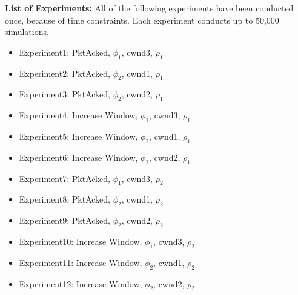 \textbf{List of Experiments:}
All of the following experiments have been conducted once, because of time constraints. Each experiment conducts up to 50,000 simulations.
\begin{itemize}
	\item{Experiment1: PktAcked, $\phi_1$, cwnd3, $\rho_1$}
	\item{Experiment2: PktAcked, $\phi_2$, cwnd1, $\rho_1$}
	\item{Experiment3: PktAcked, $\phi_2$, cwnd2, $\rho_1$}
	\item{Experiment4: Increase Window, $\phi_1$, cwnd3, $\rho_1$}
	\item{Experiment5: Increase Window, $\phi_2$, cwnd1, $\rho_1$}
	\item{Experiment6: Increase Window, $\phi_2$, cwnd2, $\rho_1$}
	\item{Experiment7: PktAcked, $\phi_1$, cwnd3, $\rho_2$}
	\item{Experiment8: PktAcked, $\phi_2$, cwnd1, $\rho_2$}
	\item{Experiment9: PktAcked, $\phi_2$, cwnd2, $\rho_2$}
	\item{Experiment10: Increase Window, $\phi_1$, cwnd3, $\rho_2$}
	\item{Experiment11: Increase Window, $\phi_2$, cwnd1, $\rho_2$}
	\item{Experiment12: Increase Window, $\phi_2$, cwnd2, $\rho_2$}
\end{itemize}

